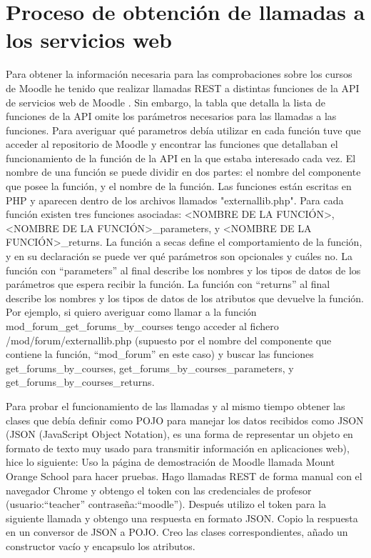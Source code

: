 \section{Proceso de obtención de llamadas a los servicios web}
Para obtener la información necesaria para las comprobaciones sobre los cursos de Moodle he tenido que realizar llamadas REST a distintas funciones de la API de servicios web de Moodle \cite{wsapifunctions-2021}. Sin embargo, la tabla que detalla la lista de funciones de la API omite los parámetros necesarios para las llamadas a las funciones.
Para averiguar qué parametros debía utilizar en cada función tuve que acceder al repositorio de Moodle \cite{moodlerepository-2022} y encontrar las funciones que detallaban el funcionamiento de la función de la API en la que estaba interesado cada vez.
El nombre de una función se puede dividir en dos partes: el nombre del componente que posee la función, y el nombre de la función. Las funciones están escritas en PHP y aparecen dentro de los archivos llamados "externallib.php". Para cada función existen tres funciones asociadas: <NOMBRE DE LA FUNCIÓN>, <NOMBRE DE LA FUNCIÓN>\_parameters, y <NOMBRE DE LA FUNCIÓN>\_returns.
La función a secas define el comportamiento de la función, y en su declaración se puede ver qué parámetros son opcionales y cuáles no.
La función con ``parameters'' al final describe los nombres y los tipos de datos de los parámetros que espera recibir la función.
La función con ``returns'' al final describe los nombres y los tipos de datos de los atributos que devuelve la función.
Por ejemplo, si quiero averiguar como llamar a la función mod\_forum\_get\_forums\_by\_courses
tengo acceder al fichero /mod/forum/externallib.php (supuesto por el nombre del componente que contiene la función, ``mod\_forum'' en este caso) y buscar las funciones get\_forums\_by\_courses, get\_forums\_by\_courses\_parameters, y get\_forums\_by\_courses\_returns.

Para probar el funcionamiento de las llamadas y al mismo tiempo obtener las clases que debía definir como POJO para manejar los datos recibidos como JSON (JSON (JavaScript Object Notation), es una forma de representar un objeto en formato de texto muy usado para transmitir información en aplicaciones web), hice lo siguiente:
Uso la página de demostración de Moodle llamada Mount Orange School para hacer pruebas.
Hago llamadas REST de forma manual con el navegador Chrome y obtengo el token con las credenciales de profesor (usuario:``teacher'' contraseña:``moodle''). Después utilizo el token para la siguiente llamada y obtengo una respuesta en formato JSON.  Copio la respuesta en un conversor de JSON a POJO. Creo las clases correspondientes, añado un constructor vacío y encapsulo los atributos. 


